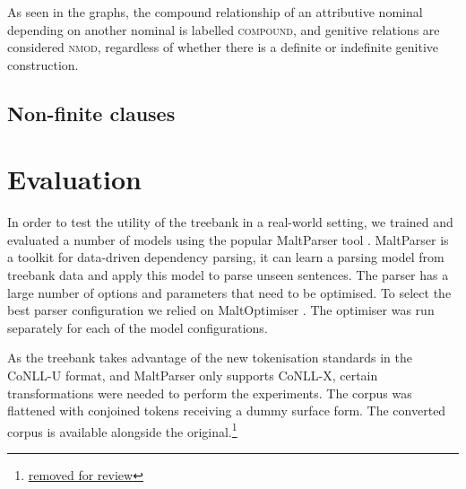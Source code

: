 \documentclass[a4paper,11pt, onecolumn,twoside]{article}
\newcommand{\udtag}[1]{{\ll \textsc{#1}}}
\begin{document}
As seen in the graphs, the compound relationship of an attributive nominal depending on another nominal is labelled \udtag{compound}, and genitive relations are considered \udtag{nmod}, regardless of whether there is a definite or indefinite genitive construction.


\subsection{Non-finite clauses}


\section{Evaluation}

In order to test the utility of the treebank in a real-world setting, we trained
and evaluated a number of models using the popular MaltParser tool \parencite{nivre07}.
MaltParser is a toolkit for data-driven dependency parsing, it can learn a parsing
model from treebank data and apply this model to parse unseen sentences. The parser
has a large number of options and parameters that need to be optimised. 
To select the best parser configuration we relied on 
MaltOptimiser \parencite{ballesteros15}. The optimiser was run separately for each of 
the model configurations.

As the treebank takes advantage of the new tokenisation standards in the CoNLL-U format,
and MaltParser only supports CoNLL-X, certain transformations were needed to perform 
the experiments. The corpus was flattened with conjoined tokens receiving a dummy 
surface form. The converted corpus is available alongside the original.\footnote{\url{removed for review}}




\end{document}
